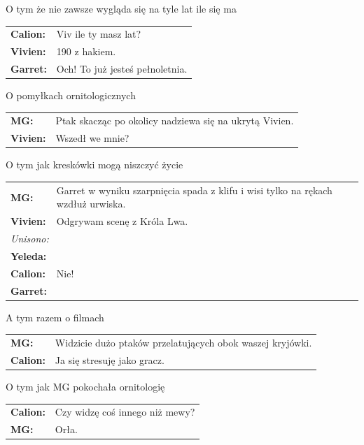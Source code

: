 \documentclass[10pt,twoside,twocolumn]{book}
\begin{document}
\begin{rpg-quotebox}{O tym że nie zawsze wygląda się na tyle lat ile się ma}
   \begin{tabularx}{\columnwidth}{lX}
      \textbf{Calion:} & Viv ile ty masz lat?\\
      \textbf{Vivien:} & 190 z hakiem.\\
      \textbf{Garret:} & Och! To już jesteś pełnoletnia.\\
   \end{tabularx}
\end{rpg-quotebox}

\begin{rpg-quotebox}{O pomyłkach ornitologicznych}
   \begin{tabularx}{\columnwidth}{lX}
      \textbf{MG:} & Ptak skacząc po okolicy nadziewa się na ukrytą Vivien.\\
      \textbf{Vivien:} & Wszedł we mnie?\\
   \end{tabularx}
\end{rpg-quotebox}

\begin{rpg-quotebox}{O tym jak kreskówki mogą niszczyć życie}
   \begin{tabularx}{\columnwidth}{lX}
      \textbf{MG:} & Garret w wyniku szarpnięcia spada z klifu i wisi tylko na rękach wzdłuż urwiska.\\
      \textbf{Vivien:} & Odgrywam scenę z Króla Lwa.\\
      \multicolumn{2}{l}{\textit{Unisono:}}\\
      \textbf{Yeleda:} & \multirow{3}{*}{Nie!}\\
      \textbf{Calion:} & \\
      \textbf{Garret:} & \\
   \end{tabularx}
\end{rpg-quotebox}

\begin{rpg-quotebox}{A tym razem o filmach}
   \begin{tabularx}{\columnwidth}{lX}
      \textbf{MG:} & Widzicie dużo ptaków przelatujących obok waszej kryjówki.\\
      \textbf{Calion:} & Ja się stresuję jako gracz.\\
   \end{tabularx}
\end{rpg-quotebox}

\begin{rpg-quotebox}{O tym jak MG pokochała ornitologię}
   \begin{tabularx}{\columnwidth}{lX}
      \textbf{Calion:} & Czy widzę coś innego niż mewy?\\
      \textbf{MG:} & Orła.\\
   \end{tabularx}
\end{rpg-quotebox}
\end{document}
